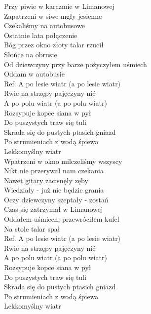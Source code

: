 
Przy piwie w karczmie w Limanowej \tab{}\\
Zapatrzeni w siwe mgły jesienne\tab{}\\
Czekaliśmy na autobusowe \tab{}\tab{}\\
Ostatnie lata połączenie\tab{} \tab{}\\
Bóg przez okno złoty talar rzucił \tab{}\\
Słońce na obrusie \tab{}\tab{}\\
Od dziewczyny przy barze pożyczyłem uśmiech \\
Oddam w autobusie \tab{}\tab{}\\
\hops
Ref. A po lesie wiatr (a po lesie wiatr)  \\
 Rwie na strzępy pajęczyny nić  \\
 A po polu wiatr (a po polu wiatr)  \\
 Rozsypuje kopce siana w pył  \\
 Do puszystych traw się tuli  \\
 Skrada się do pustych ptasich gniazd   \\
 Po strumieniach z wodą śpiewa  \\
 Lekkomyślny wiatr \tab{}\\
\hops
Wpatrzeni w okno milczeliśmy wszyscy \\
Nikt nie przerywał nam czekania \\
Nawet gitary zacisnęły zęby \\
Wiedziały - już nie będzie grania \\
Oczy dziewczyny szeptały - zostań \\
Czas się zatrzymał w Limanowej \\
Oddałem uśmiech, przewróciłem kufel \\
Na stole talar spał \\
\hops
Ref. A po lesie wiatr (a po lesie wiatr) \\
 Rwie na strzępy pajęczyny nić  \\
 A po polu wiatr (a po polu wiatr)  \\
 Rozsypuje kopce siana w pył  \\
 Do puszystych traw się tuli  \\
 Skrada się do pustych ptasich gniazd  \\
 Po strumieniach z wodą śpiewa  \\
 Lekkomyślny wiatr